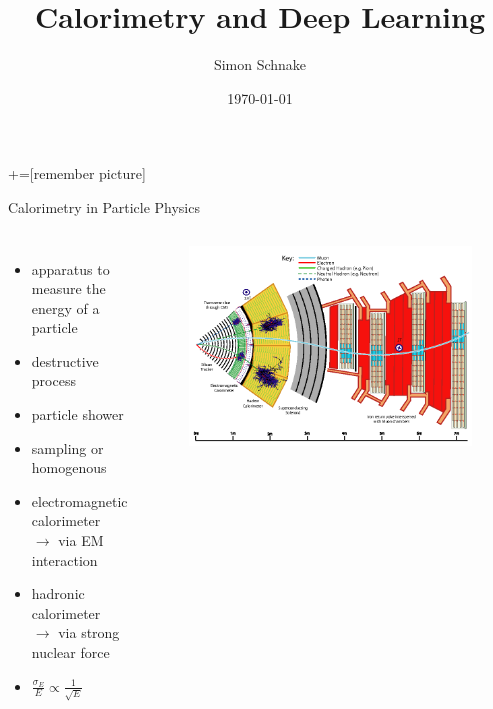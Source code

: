 \documentclass[10pt]{beamer}
\title{Calorimetry and Deep Learning}
\date{\today}
\author{Simon Schnake}
\institute{Universität Hamburg}
\begin{document}
\maketitle
{}+=[remember picture]

\begin{frame}{Calorimetry in Particle Physics}
  \begin{columns}
    \begin{itemize}
    \item apparatus to measure the energy of a particle
    \item destructive process
    \item particle shower
    \item sampling or homogenous
    \item electromagnetic calorimeter \\
      $\rightarrow$ via EM interaction
    \item hadronic calorimeter \\
      $\rightarrow$ via strong nuclear force
    \item $\frac{\sigma_E}{E} \propto \frac{1}{\sqrt{E}}$
    \end{itemize}
    \begin{figure}[htp]
      \includegraphics[width=2\textwidth]{Figure_001.png}
    \end{figure}

  \end{columns}
\end{frame}
\end{document}

